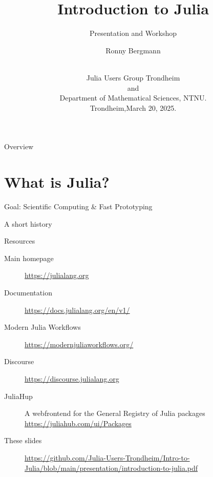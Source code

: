 \documentclass[aspectratio=169, handout]{beamer}
\title{Introduction to Julia}
\subtitle{Presentation and Workshop}
\author[Ronny Bergmann]{\large{Ronny Bergmann}\\[\baselineskip]\ }
\date[March 20, 2025]{Julia Users Group Trondheim\\[-.1\baselineskip]{\footnotesize and}\\[-.1\baselineskip]
    Department of Mathematical Sciences, NTNU.\\[\baselineskip]
    Trondheim,\hfill March 20, 2025.}
\begin{document}
	\maketitle
    \begin{frame}{Overview}
        \tableofcontents
    \end{frame}
    \section{What is Julia?}
    \begin{frame}{Goal: Scientific Computing \& Fast Prototyping}
    \end{frame}
    \begin{frame}{A short history}
    \end{frame}
    \begin{frame}{Resources}
        \begin{description}
            \item[Main homepage] \url{https://julialang.org}
            \item[Documentation] \url{https://docs.julialang.org/en/v1/}
            \item[Modern Julia Workflows] \url{https://modernjuliaworkflows.org/}
            \item[Discourse] \url{https://discourse.julialang.org}
            \item[JuliaHup] A webfrontend for the General Registry of Julia packages
            \url{https://juliahub.com/ui/Packages}
            \item[These slides] \url{https://github.com/Julia-Users-Trondheim/Intro-to-Julia/blob/main/presentation/introduction-to-julia.pdf}
        \end{description}
    \end{frame}
\end{document}
